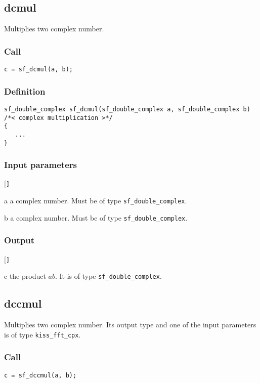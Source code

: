 \subsection{{dcmul}}
Multiplies two complex number.

\subsubsection*{Call}
\begin{verbatim}c = sf_dcmul(a, b);\end{verbatim}

\subsubsection*{Definition}
\begin{verbatim}
sf_double_complex sf_dcmul(sf_double_complex a, sf_double_complex b)
/*< complex multiplication >*/
{
   ...
}
\end{verbatim}

\subsubsection*{Input parameters}
\begin{desclist}{\tt }{\quad}[\tt ]
   \setlength\itemsep{0pt}
   \item[a] a complex number. Must be of type \texttt{sf\_double\_complex}.  
   \item[b] a complex number. Must be of type \texttt{sf\_double\_complex}.  
\end{desclist}

\subsubsection*{Output}
\begin{desclist}{\tt }{\quad}[\tt ]
   \setlength\itemsep{0pt}
   \item[c] the product $ab$. It is of type \texttt{sf\_double\_complex}.
\end{desclist}




\subsection{{dccmul}}
Multiplies two complex number. Its output type and one of the input parameters is of type \texttt{kiss\_fft\_cpx}.

\subsubsection*{Call}
\begin{verbatim}c = sf_dccmul(a, b);
\end{verbatim}

